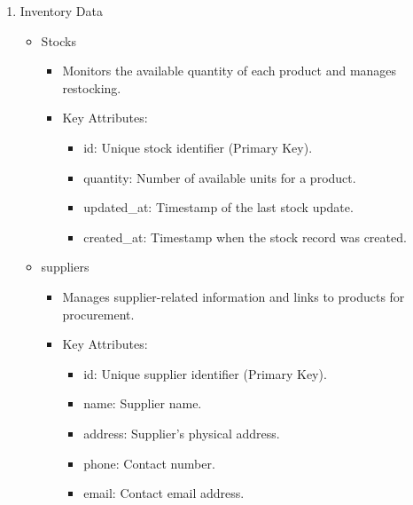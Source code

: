 \documentclass{llncs}
\begin{document}
\begin{enumerate}
\begin{itemize}
\begin{itemize}
\begin{itemize}
            \end{itemize}
        \end{itemize}
     \end{itemize}

    \item Inventory Data\\
    \begin{itemize}
        \item Stocks 
        \begin{itemize}
            \item Monitors the available quantity of each product and manages restocking.
            \item Key Attributes:
            \begin{itemize}
                \item id: Unique stock identifier (Primary Key).
                \item quantity: Number of available units for a product.
                \item updated\_at: Timestamp of the last stock update.
                \item created\_at: Timestamp when the stock record was created.\\
                
            \end{itemize}
        \end{itemize}
        \item suppliers
        \begin{itemize}
            \item Manages supplier-related information and links to products for procurement.
            \item Key Attributes:
            \begin{itemize}
                \item id: Unique supplier identifier (Primary Key).
                \item name: Supplier name.
                \item address: Supplier’s physical address.
                \item phone: Contact number.
                \item email: Contact email address.
                
            \end{itemize}
        \end{itemize}
    \end{itemize}
\end{enumerate}
\end{document}
